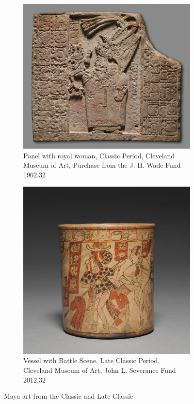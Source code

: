 \documentclass[../main.tex]{subfiles}
\begin{document}
\begin{figure}
    \centering
    \begin{subfigure}[b]{0.49\textwidth}
        \centering
        \includegraphics[width=\textwidth]{img/panel-with-royal-woman}
        \caption{Panel with royal woman, Classic Period,
                 Cleveland Museum of Art, Purchase from the J. H. Wade Fund 1962.32}
        \label{fig:introduction-panel-with-royal-woman}
    \end{subfigure}
    \hfill
    \begin{subfigure}[b]{0.49\textwidth}
        \centering
        \includegraphics[width=\textwidth]{img/vessel-with-battle-scene}
        \caption{Vessel with Battle Scene, Late Classic Period,
                 Cleveland Museum of Art, John L. Severance Fund 2012.32}
        \label{fig:introduction-vessel-with-battle-scene}
    \end{subfigure}
    \caption{Maya art from the Classic and Late Classic}
\end{figure}
\end{document}
